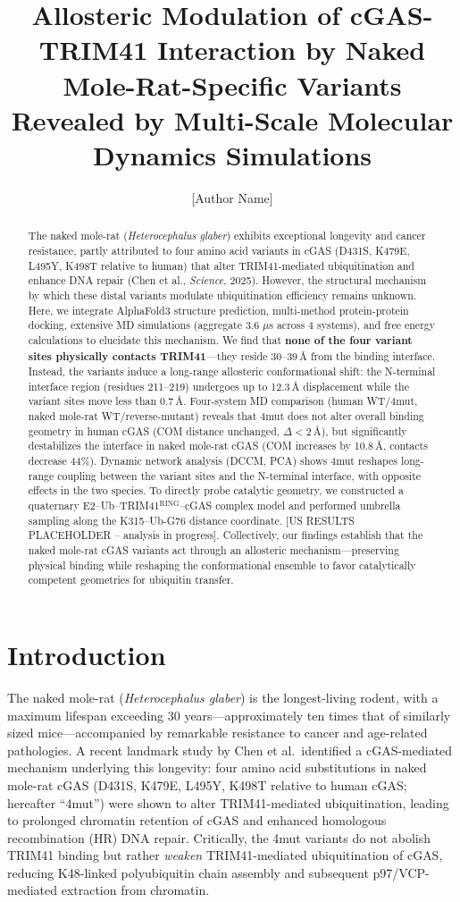 \documentclass[journal=jcisd8, manuscript=article]{achemso}
\title{Allosteric Modulation of cGAS-TRIM41 Interaction by Naked Mole-Rat-Specific Variants Revealed by Multi-Scale Molecular Dynamics Simulations}
\author{[Author Name]}
\affiliation{[Affiliation]}
\begin{document}
\begin{abstract}
The naked mole-rat (\textit{Heterocephalus glaber}) exhibits exceptional longevity and cancer resistance, partly attributed to four amino acid variants in cGAS (D431S, K479E, L495Y, K498T relative to human) that alter TRIM41-mediated ubiquitination and enhance DNA repair (Chen et al., \textit{Science}, 2025). However, the structural mechanism by which these distal variants modulate ubiquitination efficiency remains unknown. Here, we integrate AlphaFold3 structure prediction, multi-method protein-protein docking, extensive MD simulations (aggregate 3.6 $\mu$s across 4 systems), and free energy calculations to elucidate this mechanism. We find that \textbf{none of the four variant sites physically contacts TRIM41}---they reside 30--39\,\AA{} from the binding interface. Instead, the variants induce a long-range allosteric conformational shift: the N-terminal interface region (residues 211--219) undergoes up to 12.3\,\AA{} displacement while the variant sites move less than 0.7\,\AA. Four-system MD comparison (human WT/4mut, naked mole-rat WT/reverse-mutant) reveals that 4mut does not alter overall binding geometry in human cGAS (COM distance unchanged, $\Delta < 2$\,\AA), but significantly destabilizes the interface in naked mole-rat cGAS (COM increases by 10.8\,\AA, contacts decrease 44\%). Dynamic network analysis (DCCM, PCA) shows 4mut reshapes long-range coupling between the variant sites and the N-terminal interface, with opposite effects in the two species. To directly probe catalytic geometry, we constructed a quaternary E2--Ub--TRIM41$^{\text{RING}}$--cGAS complex model and performed umbrella sampling along the K315--Ub-G76 distance coordinate. [US RESULTS PLACEHOLDER -- analysis in progress]. Collectively, our findings establish that the naked mole-rat cGAS variants act through an allosteric mechanism---preserving physical binding while reshaping the conformational ensemble to favor catalytically competent geometries for ubiquitin transfer.
\end{abstract}

\section{Introduction}

The naked mole-rat (\textit{Heterocephalus glaber}) is the longest-living rodent, with a maximum lifespan exceeding 30 years---approximately ten times that of similarly sized mice---accompanied by remarkable resistance to cancer and age-related pathologies.\cite{buffenstein2005} A recent landmark study by Chen et al.\ identified a cGAS-mediated mechanism underlying this longevity: four amino acid substitutions in naked mole-rat cGAS (D431S, K479E, L495Y, K498T relative to human cGAS; hereafter ``4mut'') were shown to alter TRIM41-mediated ubiquitination, leading to prolonged chromatin retention of cGAS and enhanced homologous recombination (HR) DNA repair.\cite{chen2025} Critically, the 4mut variants do not abolish TRIM41 binding but rather \textit{weaken} TRIM41-mediated ubiquitination of cGAS, reducing K48-linked polyubiquitin chain assembly and subsequent p97/VCP-mediated extraction from chromatin.
\end{document}
